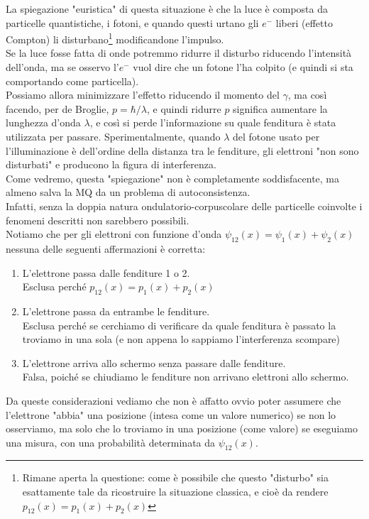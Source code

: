 \documentclass[FisicaTeorica.tex]{subfiles}
\begin{document}
La spiegazione "euristica" di questa situazione è che la luce è composta da particelle quantistiche, i fotoni, e quando questi urtano gli $e^-$ liberi (effetto Compton) li disturbano\footnote{Rimane aperta la questione: come è possibile che questo "disturbo" sia esattamente tale da ricostruire la situazione classica, e cioè da rendere $p_{12}(x) = p_1(x) + p_2(x)$} modificandone l'impulso.\\
Se la luce fosse fatta di onde potremmo ridurre il disturbo riducendo l'intensità dell'onda, ma se osservo l'$e^-$ vuol dire che un fotone l'ha colpito (e quindi si sta comportando come particella).\\
Possiamo allora minimizzare l'effetto riducendo il momento del $\gamma$, ma così facendo, per de Broglie, $p = \hbar / \lambda$, e quindi ridurre $p$ significa aumentare la lunghezza d'onda $\lambda$, e così si perde l'informazione su quale fenditura è stata utilizzata per passare. Sperimentalmente, quando $\lambda$ del fotone usato per l'illuminazione è dell'ordine della distanza tra le fenditure, gli elettroni "non sono disturbati" e producono la figura di interferenza.\\
Come vedremo, questa "spiegazione" non è completamente soddisfacente, ma almeno salva la MQ da un problema di autoconsistenza.\\
Infatti, senza la doppia natura ondulatorio-corpuscolare delle particelle coinvolte i fenomeni descritti non sarebbero possibili.\\
Notiamo che per gli elettroni con funzione d'onda
$\psi_{12}(x) = \psi_1(x) + \psi_2(x)$
nessuna delle seguenti affermazioni è corretta:
\begin{enumerate}
    \item L'elettrone passa dalle fenditure 1 o 2.\\
    Esclusa perché $p_{12}(x) = p_1(x) + p_2(x)$
    \item L'elettrone passa da entrambe le fenditure.\\
    Esclusa perché se cerchiamo di verificare da quale fenditura è passato la troviamo in una sola (e non appena lo sappiamo l'interferenza scompare)
    \item L'elettrone arriva allo schermo senza passare dalle fenditure.\\ Falsa, poiché se chiudiamo le fenditure non arrivano elettroni allo schermo.
\end{enumerate}
Da queste considerazioni vediamo che non è affatto ovvio poter assumere che l'elettrone "abbia" una posizione (intesa come un valore numerico) se non lo osserviamo, ma solo che lo troviamo in una posizione (come valore) se eseguiamo una misura, con una probabilità determinata da $\psi_{12}(x)$.
\end{document}
